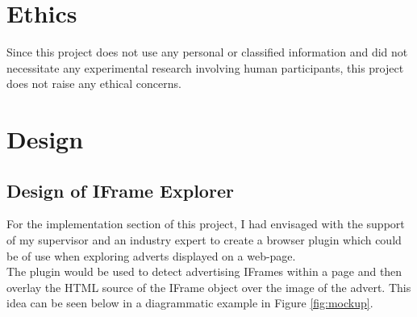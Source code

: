 \documentclass[12pt]{article}
\begin{document}
\section{Ethics}
Since this project does not use any personal or classified information and did not necessitate any experimental research involving human participants, this project does not raise any ethical concerns. 

\section{Design}

\subsection{Design of IFrame Explorer}
For the implementation section of this project, I had envisaged with the support of my supervisor and an industry expert to create a browser plugin which could be of use when exploring adverts displayed on a web-page.  \\

The plugin would be used to detect advertising IFrames within a page and then overlay the HTML source of the IFrame object over the image of the advert. This idea can be seen below in a diagrammatic example in Figure \ref{fig:mockup}. 
\end{document}
